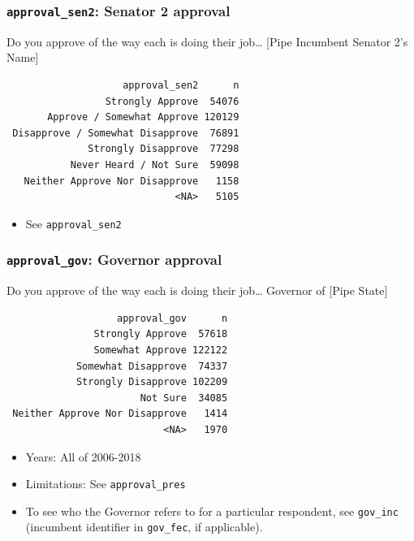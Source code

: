 \documentclass[10pt,article,oneside]{memoir}
\theoremstyle{definition}
\begin{document}
\hypertarget{approval_sen2-senator-2-approval}{%
\subsubsection{\texorpdfstring{\texttt{approval\_sen2}: Senator 2
approval}{approval\_sen2: Senator 2 approval}}\label{approval_sen2-senator-2-approval}}

Do you approve of the way each is doing their job\ldots{} {[}Pipe
Incumbent Senator 2's Name{]}

\begin{verbatim}
                    approval_sen2      n
                 Strongly Approve  54076
       Approve / Somewhat Approve 120129
 Disapprove / Somewhat Disapprove  76891
              Strongly Disapprove  77298
           Never Heard / Not Sure  59098
   Neither Approve Nor Disapprove   1158
                             <NA>   5105
\end{verbatim}

\begin{itemize}
\tightlist
\item
  See \texttt{approval\_sen2}
\end{itemize}

\hypertarget{approval_gov-governor-approval}{%
\subsubsection{\texorpdfstring{\texttt{approval\_gov}: Governor
approval}{approval\_gov: Governor approval}}\label{approval_gov-governor-approval}}

Do you approve of the way each is doing their job\ldots{} Governor of
{[}Pipe State{]}

\begin{verbatim}
                   approval_gov      n
               Strongly Approve  57618
               Somewhat Approve 122122
            Somewhat Disapprove  74337
            Strongly Disapprove 102209
                       Not Sure  34085
 Neither Approve Nor Disapprove   1414
                           <NA>   1970
\end{verbatim}

\begin{itemize}
\tightlist
\item
  Years: All of 2006-2018
\item
  Limitations: See \texttt{approval\_pres}
\item
  To see who the Governor refers to for a particular respondent, see
  \texttt{gov\_inc} (incumbent identifier in \texttt{gov\_fec}, if
  applicable).
\end{itemize}
\end{document}
